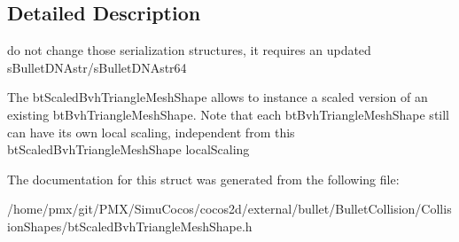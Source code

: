 \subsection{Detailed Description}
do not change those serialization structures, it requires an updated s\+Bullet\+D\+N\+Astr/s\+Bullet\+D\+N\+Astr64 

The bt\+Scaled\+Bvh\+Triangle\+Mesh\+Shape allows to instance a scaled version of an existing bt\+Bvh\+Triangle\+Mesh\+Shape. Note that each bt\+Bvh\+Triangle\+Mesh\+Shape still can have its own local scaling, independent from this bt\+Scaled\+Bvh\+Triangle\+Mesh\+Shape \textquotesingle{}local\+Scaling\textquotesingle{} 

The documentation for this struct was generated from the following file\+:\begin{DoxyCompactItemize}
\item 
/home/pmx/git/\+P\+M\+X/\+Simu\+Cocos/cocos2d/external/bullet/\+Bullet\+Collision/\+Collision\+Shapes/bt\+Scaled\+Bvh\+Triangle\+Mesh\+Shape.\+h\end{DoxyCompactItemize}
